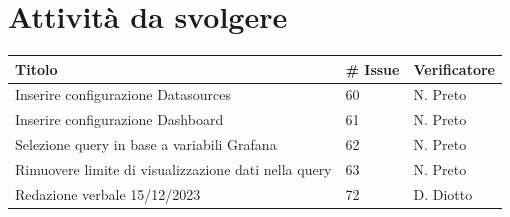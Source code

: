 \documentclass{article}
\begin{document}
\section{Attività da svolgere}
    \begin{center}
        \begin{tabular}{|C{7cm}|C{1,5cm}|C{3cm}|}
            \hline
            \textbf{Titolo} & \textbf{\# Issue} & \textbf{Verificatore} \\
            \hline\hline
            Inserire configurazione Datasources & 60 & N. Preto \\
            Inserire configurazione Dashboard & 61 & N. Preto \\
            Selezione query in base a variabili Grafana & 62 & N. Preto \\
            Rimuovere limite di visualizzazione dati nella query & 63 & N. Preto \\
            Redazione verbale 15/12/2023 & 72 & D. Diotto \\
            \hline
        \end{tabular}
    \end{center}
\end{document}
